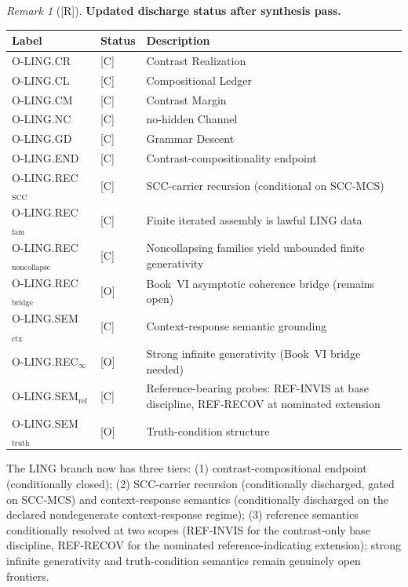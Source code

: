 \documentclass[12pt,oneside]{amsbook}
\theoremstyle{plain}
\theoremstyle{definition}
\theoremstyle{remark}
\newtheorem{remark}[theorem]{Remark}
\newcommand{\status}[1]{\textup{[#1]}}
\begin{document}
\begin{remark}[\status{R}]\label{rem:ling-closure-updated}
\textbf{Updated discharge status after synthesis pass.}

\medskip
\noindent
\begin{tabular}{|l|l|p{7.5cm}|}
\hline
\textbf{Label} & \textbf{Status} & \textbf{Description} \\
\hline
O-LING.CR & [C] & Contrast Realization \\
O-LING.CL & [C] & Compositional Ledger \\
O-LING.CM & [C] & Contrast Margin \\
O-LING.NC & [C] & no-hidden Channel \\
O-LING.GD & [C] & Grammar Descent \\
O-LING.END & [C] & Contrast-compositionality endpoint \\
O-LING.REC$_{\mathrm{SCC}}$ & [C] & SCC-carrier recursion (conditional on SCC-MCS) \\
O-LING.REC$_{\mathrm{fam}}$ & [C] & Finite iterated assembly is lawful LING data \\
O-LING.REC$_{\mathrm{noncollapse}}$ & [C] & Noncollapsing families yield unbounded finite generativity \\
O-LING.REC$_{\mathrm{bridge}}$ & [O] & Book~VI asymptotic coherence bridge (remains open) \\
O-LING.SEM$_{\mathrm{ctx}}$ & [C] & Context-response semantic grounding \\
O-LING.REC$_\infty$ & [O] & Strong infinite generativity (Book~VI bridge needed) \\
O-LING.SEM$_{\mathrm{ref}}$ & [C] & Reference-bearing probes: REF-INVIS at base discipline, REF-RECOV at nominated extension \\
O-LING.SEM$_{\mathrm{truth}}$ & [O] & Truth-condition structure \\
\hline
\end{tabular}

\medskip
The LING branch now has three tiers: (1) contrast-compositional
endpoint (conditionally closed); (2) SCC-carrier recursion
(conditionally discharged, gated on SCC-MCS) and context-response
semantics (conditionally discharged on the declared nondegenerate
context-response regime); (3) reference semantics conditionally resolved at two scopes
(REF-INVIS for the contrast-only base discipline, REF-RECOV for
the nominated reference-indicating extension); strong infinite
generativity and truth-condition semantics remain genuinely open
frontiers.
\end{remark}
\end{document}

